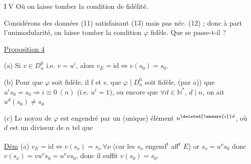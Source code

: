 \textcircled{\small IV} Où on laisse tomber la condition de fidélité.

Considérons des données (11) satisfaisant (13) mais pas néc. (12) ; donc à part l'unimodularité, on laisse tomber la condition $\varphi$ fidèle. Que se passe-t-il ?

\uline{Proposition 4}  

(a) Si $v\in D_n^0$ i.e. $v=u^i$, alors $v_E=\mathrm{id}\iff v(s_0)=s_0$.

(b) Pour que $\varphi$ soit fidèle, il f et s. que $\varphi\mid D_n^0$ soit fidèle,   (par a)) que $u^i s_0=s_0\Longrightarrow i\equiv0\ (n)$ (i.e. $u^i=1$), ou encore que $\forall d\in{\mathbb N}^*$, $d\mid n$, on ait $u^d(s_0)\ne s_0$ 

(c)  Le noyau de $\varphi$  est  engendré par un (unique) élément $u^{\deleted{\unsure{i}}d}$, où  $d$ est un diviseur de $n$ tel que  

\uline{Dém} (a) $v_E=\mathrm{id}\iff v(s_{\nu})=s_\nu\ \forall\nu$ (car les $s_\nu$ engend\textsuperscript{t} aff\textsuperscript{t} $E$) or $s_\nu=u^\nu s_0$ donc $v(s_\nu)=vu^\nu s_0=u^\nu v s_0$, donc il suffit $v(s_0)=s_0$.
